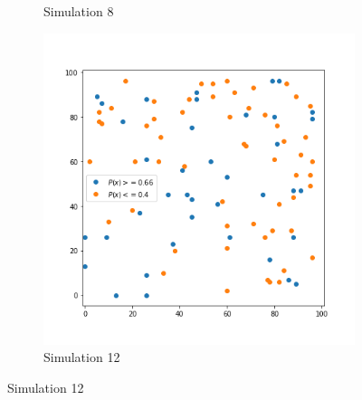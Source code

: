 \begin{figure}[!ht]
\begin{subfigure}{.3\textwidth}
	    \caption{Simulation 8}
	    \label{fig:meine-grafik}
    \end{subfigure}%
	\begin{subfigure}{.3\textwidth}
    	\centering
    	\includegraphics[width=1\linewidth]{Bilder/simulation_4_3}
    	\caption{Simulation 12}
    	\label{fig:meine-grafik}
	\end{subfigure}
\end{figure}

